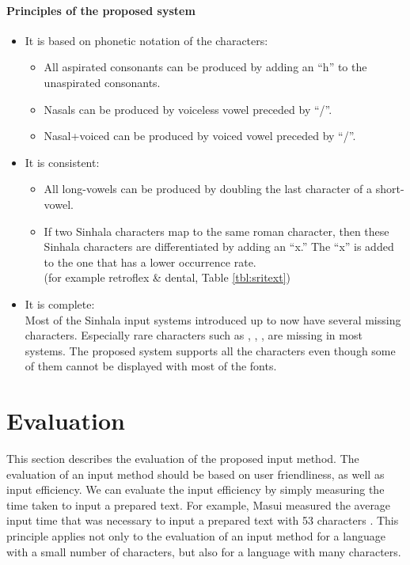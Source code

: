 \documentclass[english]{jnlp_1.3e}
\begin{document}
\paragraph{Principles of the proposed system}
\begin{itemize}
\item 
It is based on phonetic notation of the characters:
\begin{itemize}
\item 
All aspirated consonants can be produced by adding an ``h'' to the unaspirated consonants. 
\item
Nasals can be produced by voiceless vowel preceded by ``/''.
\item
Nasal+voiced can be produced by voiced vowel preceded by ``/''.
\end{itemize}

\item 
It is consistent:
\begin{itemize}
\item 
All long-vowels can be produced by doubling the last character of  a  short-vowel.
\item 
If two Sinhala characters map to the same roman character, then these Sinhala characters are differentiated by adding an  ``x.''  
 The ``x'' is added to the one  that  has  a  lower occurrence rate. \\(for example retroflex \& dental, Table \ref{tbl:sritext})
\end{itemize}

\item 
It is complete:\\
Most of the Sinhala input systems introduced up to now have several missing characters. Especially  rare characters such as {\SHa{}}  ,{\SHa{}} ,{\SHa{}}  ,{\SHa{}}  are missing in most systems. 
The proposed system supports all the characters even though some of them cannot be displayed with most of the fonts.
\end{itemize}





\section{Evaluation}
\label{evaluation}

This section describes the evaluation of the proposed input method.
The evaluation of an input method should be based on user friendliness, as well as input efficiency. 
We can evaluate the input efficiency by simply measuring the time taken to input a prepared text. 
For example, Masui measured the average input time that was necessary to input a prepared text with 53 
    characters \cite{masui}. 
This principle applies not only to the evaluation of an input method for a language with a small number of characters, but also for a language with many characters.
\end{document}
